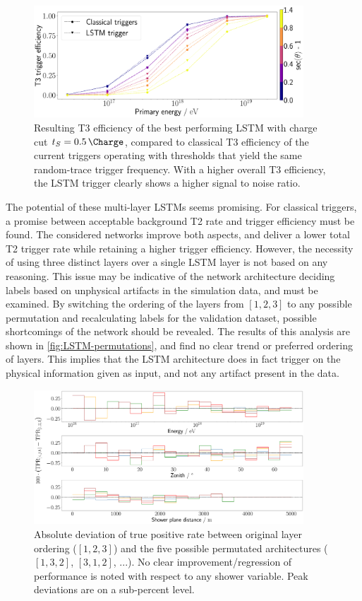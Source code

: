 \begin{figure}
	\centering
	\includegraphics[width=0.9\textwidth]{./plots/LSTM_T3_efficiency.png}
	\caption{Resulting T3 efficiency of the best performing LSTM with charge cut $t_S = \SI{0.5}{\Charge}$, compared to classical T3 efficiency of the current 
	triggers operating with thresholds that yield the same random-trace trigger frequency. With a higher overall T3 efficiency, the LSTM trigger clearly shows a 
	higher signal to noise ratio.}
	\label{fig:LSTM-t3-efficiency}
\end{figure}

The potential of these multi-layer LSTMs seems promising. For classical triggers, a promise between acceptable background T2 rate and trigger efficiency must be 
found. The considered networks improve both aspects, and deliver a lower total T2 trigger rate while retaining a higher trigger efficiency. However, the necessity
of using three distinct layers over a single LSTM layer is not based on any reasoning. This issue may be indicative of the network architecture deciding
labels based on unphysical artifacts in the simulation data, and must be examined. By switching the ordering of the layers from $[1, 2, 3]$ to any possible 
permutation and recalculating labels for the validation dataset, possible shortcomings of the network should be revealed. The results of this analysis are shown 
in \autoref{fig:LSTM-permutations}, and find no clear trend or preferred ordering of layers. This implies that the LSTM architecture does in fact trigger on the 
physical information given as input, and not any artifact present in the data.

\begin{figure}
	\centering
	\includegraphics[width=0.9\textwidth]{./plots/LSTM_permutations.png}
	\caption{Absolute deviation of true positive rate between original layer ordering ($[1, 2, 3]$) and the five possible permutated architectures ($[1, 3, 2]$, 
	$[3, 1, 2]$, ...). No clear improvement/regression of performance is noted with respect to any shower variable. Peak deviations are on a sub-percent level.}
	\label{fig:LSTM-permutations}
\end{figure}